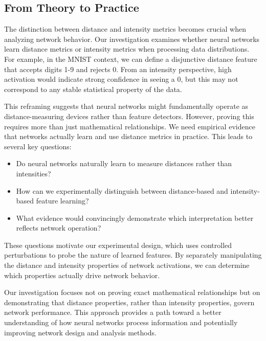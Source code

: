 \subsection{From Theory to Practice}

The distinction between distance and intensity metrics becomes crucial when analyzing network behavior. Our investigation examines whether neural networks learn distance metrics or intensity metrics when processing data distributions. For example, in the MNIST context, we can define a disjunctive distance feature that accepts digits 1-9 and rejects 0. From an intensity perspective, high activation would indicate strong confidence in seeing a 0, but this may not correspond to any stable statistical property of the data.

This reframing suggests that neural networks might fundamentally operate as distance-measuring devices rather than feature detectors. However, proving this requires more than just mathematical relationships. We need empirical evidence that networks actually learn and use distance metrics in practice. This leads to several key questions:

\begin{itemize}
    \item Do neural networks naturally learn to measure distances rather than intensities?
    \item How can we experimentally distinguish between distance-based and intensity-based feature learning?
    \item What evidence would convincingly demonstrate which interpretation better reflects network operation?
\end{itemize}

These questions motivate our experimental design, which uses controlled perturbations to probe the nature of learned features. By separately manipulating the distance and intensity properties of network activations, we can determine which properties actually drive network behavior.

Our investigation focuses not on proving exact mathematical relationships but on demonstrating that distance properties, rather than intensity properties, govern network performance. This approach provides a path toward a better understanding of how neural networks process information and potentially improving network design and analysis methods.
